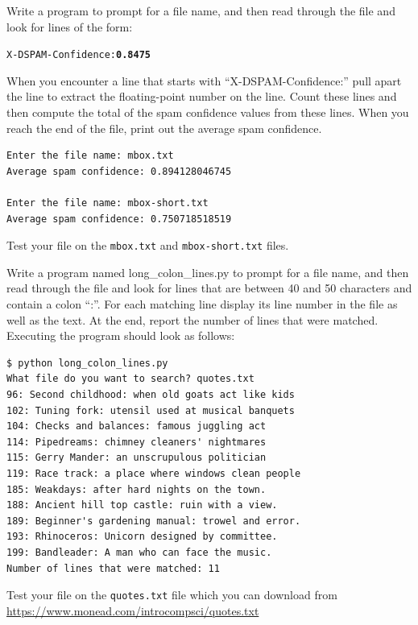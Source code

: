 \begin{ex}
Write a program 
to prompt for a file name, and then read through the file 
and look for lines of the form:

\beforeverb
\begin{alltt}
X-DSPAM-Confidence: {\bf 0.8475}
\end{alltt}
\afterverb

When you encounter a line that starts with 
``X-DSPAM-Confidence:'' pull apart the line to extract the
floating-point number on the line.  Count these lines and
then compute the total of the spam confidence values from
these lines. When you reach the end of the file, print out
the average spam confidence.

\beforeverb
\begin{verbatim}
Enter the file name: mbox.txt
Average spam confidence: 0.894128046745

Enter the file name: mbox-short.txt
Average spam confidence: 0.750718518519
\end{verbatim}
\afterverb
%
Test your file on the {\tt mbox.txt} and {\tt mbox-short.txt} files.
\end{ex}


\begin{ex}
Write a program named long\_colon\_lines.py
to prompt for a file name, and then read through the file 
and look for lines that are between 40 and 50 characters and contain a colon ``:''. For each matching line display its line number in the file as well as the text. At the end, report the number of lines that were matched. Executing the program should look as follows:

\beforeverb
\begin{verbatim}
$ python long_colon_lines.py
What file do you want to search? quotes.txt
96: Second childhood: when old goats act like kids
102: Tuning fork: utensil used at musical banquets
104: Checks and balances: famous juggling act
114: Pipedreams: chimney cleaners' nightmares
115: Gerry Mander: an unscrupulous politician
119: Race track: a place where windows clean people
185: Weakdays: after hard nights on the town.
188: Ancient hill top castle: ruin with a view.
189: Beginner's gardening manual: trowel and error.
193: Rhinoceros: Unicorn designed by committee.
199: Bandleader: A man who can face the music.
Number of lines that were matched: 11
\end{verbatim}
\afterverb
%
Test your file on the {\tt quotes.txt} file which 
you can download from
\url{https://www.monead.com/introcompsci/quotes.txt}
\end{ex}